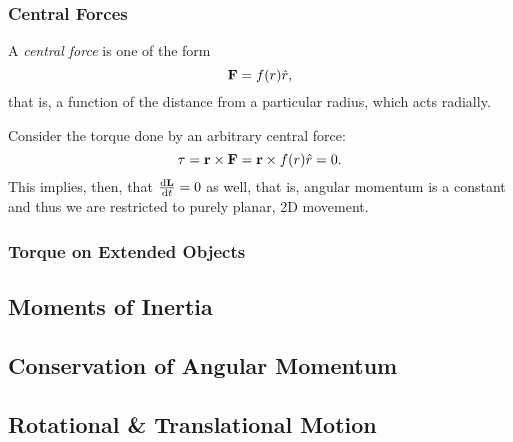 \documentclass[12pt]{article}
\begin{document}
\subsubsection{Central Forces}

\begin{definition}
  A \emph{central force} is one of the form \[
  \vb{F} = f(r) \hat{r},  
  \]
  that is, a function of the distance from a particular radius, which acts radially.
\end{definition}

Consider the torque done by an arbitrary central force:
\[
  \vb{\tau} = \vb{r} \times \vb{F} = \vb{r} \times f(r) \hat{r} = 0.  
\]
This implies, then, that $\dv{\vb{L}}{t} = 0$ as well, that is, angular momentum is a constant and thus we are restricted to purely planar, 2D movement.

\subsubsection{Torque on Extended Objects}

\subsection{Moments of Inertia}

\begin{theorem}
  
\end{theorem}

\begin{theorem}
  
\end{theorem}


\subsection{Conservation of Angular Momentum}


\subsection{Rotational \& Translational Motion}
\end{document}
